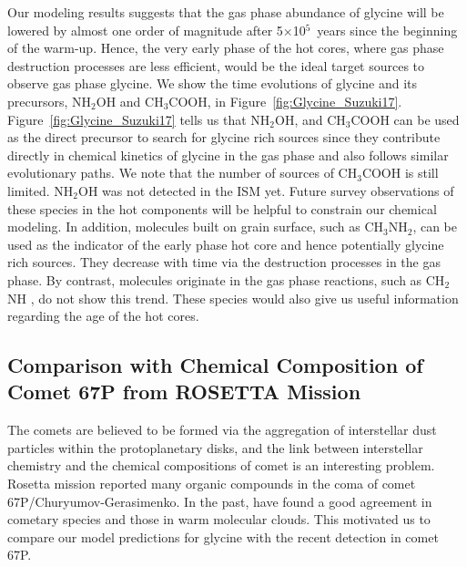 \documentclass{aastex61}
\begin{document}
Our modeling results suggests that the gas phase abundance of glycine will be lowered by almost one order of magnitude after 5$\times$10$^{5}$~years since the beginning of the warm-up.
%
Hence, the very early phase of the hot cores, where gas phase destruction processes are less efficient, would be the ideal target sources to observe gas phase glycine.
%
%
%
%
We show the time evolutions of glycine and its precursors, NH$_2$OH and CH$_3$COOH, in Figure~\ref{fig:Glycine_Suzuki17}.
%
Figure~\ref{fig:Glycine_Suzuki17} tells us that NH$_2$OH, and CH$_3$COOH can be used as the direct precursor to search for glycine rich sources since they contribute directly in chemical kinetics of glycine in the gas phase and also follows similar evolutionary paths.
%
We note that the number of sources of CH$_3$COOH is still limited.
%
NH$_2$OH was not detected in the ISM yet.
%
Future survey observations of these species in the hot components will be helpful to constrain our chemical modeling.
%
In addition, molecules built on grain surface, such as CH$_3$NH$_2$, can be used as the indicator of the early phase hot core and hence potentially glycine rich sources.
%
They decrease with time via the destruction processes in the gas phase.
%
By contrast, molecules originate in the gas phase reactions, such as CH$_2$NH  \citep{Suzuki16}, do not show this trend.
%
These species would also give us useful information regarding the age of the hot cores.
%


\subsection{Comparison with Chemical Composition of Comet 67P from ROSETTA Mission}
The comets are believed to be formed via the aggregation of interstellar dust particles within the protoplanetary disks, and the link between interstellar chemistry and the chemical compositions of comet is an interesting problem.
%
Rosetta mission reported many organic compounds in the coma of comet 67P/Churyumov-Gerasimenko.
%
In the past, \cite{Biver15} have found a good agreement in cometary species and those in warm molecular clouds.
%
This motivated us to compare our model predictions for glycine with the recent detection in comet 67P. 
%
\end{document}
